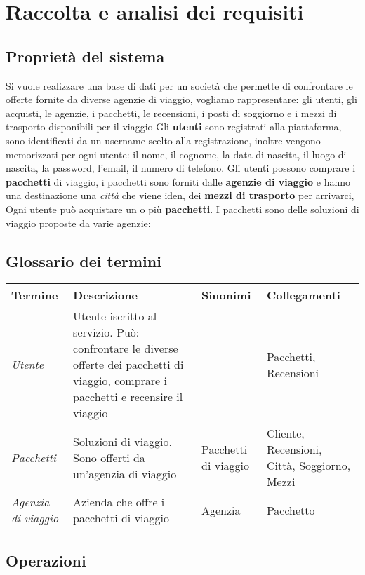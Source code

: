 \section{Raccolta e analisi dei requisiti}
\subsection{Proprietà del sistema}
%
%
Si vuole realizzare una base di dati per un società che permette di confrontare le offerte fornite da diverse agenzie di viaggio, vogliamo rappresentare: gli utenti, gli acquisti, le agenzie, i pacchetti, le recensioni, i posti di soggiorno e i mezzi di trasporto disponibili per il viaggio
%
%
Gli \textbf{utenti} sono registrati alla piattaforma, sono identificati da un username scelto alla registrazione, inoltre vengono memorizzati per ogni utente: il nome, il cognome, la data di nascita, il luogo di nascita, la password, l'email, il numero di telefono. Gli utenti possono comprare i \textbf{pacchetti} di viaggio, i pacchetti sono forniti dalle \textbf{agenzie di viaggio} e hanno una destinazione una \emph{città} che viene iden, dei \textbf{mezzi di trasporto} per arrivarci,
%
%
Ogni utente può acquistare un o più \textbf{pacchetti}. I pacchetti sono delle soluzioni di viaggio proposte da varie agenzie:
\subsection{Glossario dei termini}
\begin{tabularx}{\textwidth}{XXXX}
    \toprule
    \textbf{Termine} & \textbf{Descrizione} & \textbf{Sinonimi} & \textbf{Collegamenti} \\
    \midrule
    \emph{Utente} & Utente iscritto al servizio. Può: confrontare le diverse offerte dei pacchetti di viaggio, comprare i pacchetti e recensire il viaggio & & Pacchetti, Recensioni
    \\\midrule
    \emph{Pacchetti} & Soluzioni di viaggio. Sono offerti da un'agenzia di viaggio & Pacchetti di viaggio & Cliente, Recensioni, Città, Soggiorno, Mezzi
    \\\midrule
    \emph{Agenzia di viaggio} & Azienda che offre i pacchetti di viaggio & Agenzia & Pacchetto
    \\\midrule
    \bottomrule
\end{tabularx}

\subsection{Operazioni}

